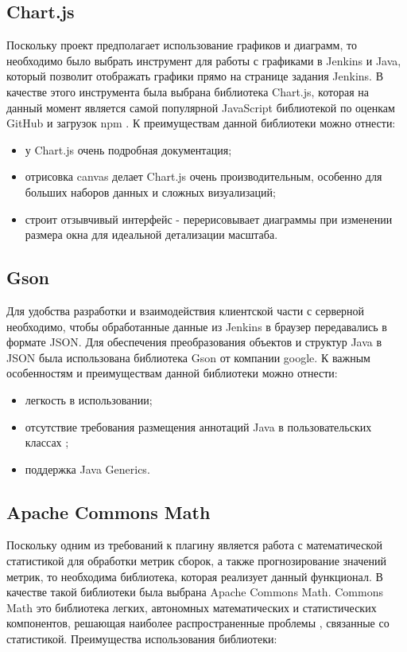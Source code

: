 \subsection{Chart.js}

Поскольку проект предполагает использование графиков и диаграмм, то необходимо было выбрать инструмент для работы с графиками в Jenkins и Java, который позволит отображать графики прямо на странице задания Jenkins. В качестве этого инструмента была выбрана библиотека Chart.js, которая на данный момент является самой популярной JavaScript библиотекой по оценкам GitHub и загрузок npm \cite{chartjs}. К преимуществам данной библиотеки можно отнести: 
\begin{itemize}
	\item у Chart.js очень подробная документация;
	\item отрисовка canvas делает Chart.js очень производительным, особенно для больших наборов данных и сложных визуализаций;
	\item строит отзывчивый интерфейс - перерисовывает диаграммы при изменении размера окна для идеальной детализации масштаба.
\end{itemize}

\subsection{Gson}

Для удобства разработки и взаимодействия клиентской части с серверной необходимо, чтобы обработанные данные из Jenkins в браузер передавались в формате JSON. Для обеспечения преобразования объектов и структур Java в JSON была использована библиотека Gson от компании google. К важным особенностям и преимуществам данной библиотеки можно отнести:

\begin{itemize}
	\item легкость в использовании;
	\item отсутствие требования размещения аннотаций Java в пользовательских классах \cite{gson};
	\item поддержка Java Generics.
\end{itemize}

\subsection{Apache Commons Math}

Поскольку одним из требований к плагину является работа с математической статистикой для обработки метрик сборок, а также прогнозирование значений метрик, то необходима библиотека, которая реализует данный функционал. В качестве такой библиотеки была выбрана Apache Commons Math. Commons Math это библиотека легких, автономных математических и статистических компонентов, решающая наиболее распространенные проблемы \cite{commath}, связанные со статистикой. Преимущества использования библиотеки:

